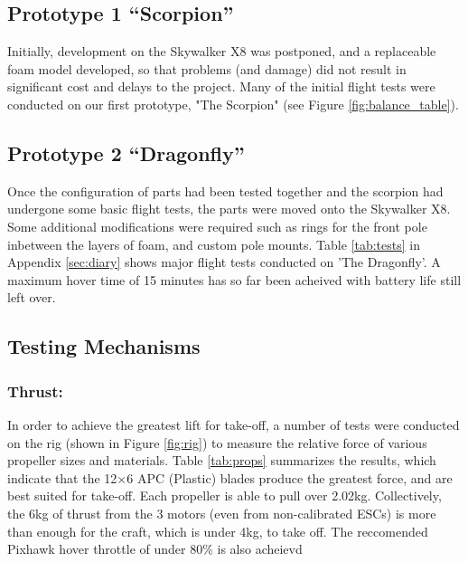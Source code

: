 
\subsection{Prototype 1 ``Scorpion''}
Initially, development on the Skywalker X8 was postponed, and a replaceable foam model developed, so that problems (and damage) did not result in significant cost and delays to the project. Many of the initial flight tests were conducted on our first prototype, "The Scorpion" (see Figure \ref{fig:balance_table}).

\subsection{Prototype 2 ``Dragonfly''}
Once the configuration of parts had been tested together and the scorpion had undergone some basic flight tests, the parts were moved onto the Skywalker X8. Some additional modifications were required such as rings for the front pole inbetween the layers of foam, and custom pole mounts. Table \ref{tab:tests} in Appendix \ref{sec:diary} shows major flight tests conducted on 'The Dragonfly'. A maximum hover time of 15 minutes has so far been acheived with battery life still left over.  

\subsection{Testing Mechanisms}
\subsubsection*{Thrust:} In order to achieve the greatest lift for take-off, a number of tests were conducted on the rig (shown in Figure \ref{fig:rig}) to measure the relative force of various propeller sizes and materials. Table \ref{tab:props} summarizes the results, which indicate that the 12$\times$6 APC (Plastic) blades produce the greatest force, and are best suited for take-off. Each propeller is able to pull over 2.02kg. Collectively, the 6kg of thrust from the 3 motors (even from non-calibrated ESCs) is more than enough for the craft, which is under 4kg, to take off. The reccomended Pixhawk hover throttle of under 80\% is also acheievd  

